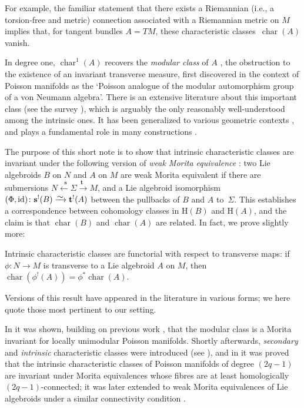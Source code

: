 \documentclass[pdftex]{sigma}
\numberwithin{equation}{section}
\newcommand{\diffto}{\xrightarrow{\raisebox{-0.2 em}[0pt][0pt]{\smash{\ensuremath{\sim}}}}}
\newcommand{\id}{\mathrm{id}}
\newcommand{\8}{\infty}
\begin{document}
For example, the familiar statement that there exists a Riemannian (i.e., a torsion-free and metric) connection associated with a Riemannian metric on $M$ implies that, for tangent bundles $A=TM$, these characteristic classes~$\operatorname{char}(A)$ vanish.

In degree one, $\operatorname{char}^1(A)$ recovers the \emph{modular class} of $A$ \cite{EvensLuAlan}, the obstruction to the existence of an invariant transverse measure, first discovered in the context of Poisson manifolds \cite{Koszul,Weinstein} as the `Poisson analogue of the modular automorphism group of a von Neumann algebra'. There is an extensive literature about this important class (see the survey \cite{Yvette}), which is arguably the only reasonably well-understood among the intrinsic ones. It has been generalized to various geometric contexts \cite{CaseiroFernandes,Grabowski,Huebschmann, Yvette_BV,YvetteLaurentAlan,Yvette_Alan,Mehta,StienonXu,Vaisman}, and plays a fundamental role in many constructions \cite{CaseiroFernandes,PMCT1,FernandesDamianou,EvensLuAlan,PT_Homology,GMP,Kubarski_Fibre,Kubarski_Mishchenko,Xu}.

The purpose of this short note is to show that intrinsic characteristic classes are invariant under the following version of \emph{weak Morita equivalence} \cite[Section~6.2]{Ginz01}: two Lie algebroids $B$ on $N$ and $A$ on $M$ are weak Morita equivalent if there are submersions $N \stackrel{\phantom{1}\mathbf{s}}{\leftarrow} \Sigma \stackrel{\mathbf{t}\phantom{1}}{\to} M$, and a Lie algebroid isomorphism $(\Phi,\id)\colon \mathbf{s}^!(B) \diffto \mathbf{t}^!(A)$ between the pullbacks of $B$ and $A$ to~$\Sigma$. This establishes a correspondence between cohomology classes in $\mathrm{H}(B)$ and $\mathrm{H}(A)$, and the claim is that $\operatorname{char}(B)$ and $\operatorname{char}(A)$ are related. In fact, we prove slightly more:

\begin{theorem*}\label{thm : pullback of char} Intrinsic characteristic classes are functorial with respect to transverse maps: if $\phi\colon N \to M$ is transverse to a Lie algebroid $A$ on $M$, then $\operatorname{char}(\phi^!(A)) = \phi^*\operatorname{char}(A)$.
\end{theorem*}

Versions of this result have appeared in the literature in various forms; we here quote those most pertinent to our setting.

In \cite[Theorem 4.2]{GinzGol} it was shown, building on previous work \cite{GinzLu}, that the modular class is a Morita invariant for locally unimodular Poisson manifolds. Shortly afterwards, \emph{secondary} and \emph{intrinsic} characteristic classes were introduced (see \cite{CrainicNL,Cr_VEst,CrFer_Char,RuiAdv,Kubarski}), and in \cite[Corollary 8]{Cr_VEst} it was proved that the intrinsic characteristic classes of Poisson manifolds of degree $(2q-1)$ are invariant under Morita equivalences whose fibres are at least homologically $(2q-1)$-connected; it was later extended to weak Morita equivalences of Lie algebroids under a similar connectivity condition \cite[Example~6.16]{Ginz01}.
\end{document}
